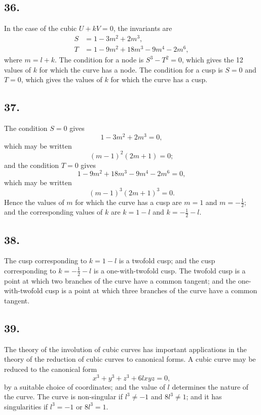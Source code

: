\documentclass[11pt,a4paper]{article}
\theoremstyle{definition}
\begin{document}
\subsection*{36.}

In the case of the cubic $U + kV = 0$, the invariants are
\begin{align*}
S &= 1 - 3m^{2} + 2m^{3},\\
T &= 1 - 9m^{2} + 18m^{3} - 9m^{4} - 2m^{6},
\end{align*}
where $m = l + k$. The condition for a node is $S^{3} - T^{2} = 0$, which gives the 12 values of $k$
for which the curve has a node. The condition for a cusp is $S = 0$ and $T = 0$, which gives
the values of $k$ for which the curve has a cusp.

\newpage
\subsection*{37.}

The condition $S = 0$ gives
\[
1 - 3m^{2} + 2m^{3} = 0,
\]
which may be written
\[
(m - 1)^{2}(2m + 1) = 0;
\]
and the condition $T = 0$ gives
\[
1 - 9m^{2} + 18m^{3} - 9m^{4} - 2m^{6} = 0,
\]
which may be written
\[
(m - 1)^{3}(2m + 1)^{3} = 0.
\]
Hence the values of $m$ for which the curve has a cusp are $m = 1$ and $m = -\frac{1}{2}$; and the
corresponding values of $k$ are $k = 1 - l$ and $k = -\frac{1}{2} - l$.

\subsection*{38.}

The cusp corresponding to $k = 1 - l$ is a twofold cusp; and the cusp corresponding to
$k = -\frac{1}{2} - l$ is a one-with-twofold cusp. The twofold cusp is a point at which two branches
of the curve have a common tangent; and the one-with-twofold cusp is a point at which
three branches of the curve have a common tangent.

\newpage
\subsection*{39.}

The theory of the involution of cubic curves has important applications in the theory
of the reduction of cubic curves to canonical forms. A cubic curve may be reduced to
the canonical form
\[
x^{3} + y^{3} + z^{3} + 6lxyz = 0,
\]
by a suitable choice of coordinates; and the value of $l$ determines the nature of the curve.
The curve is non-singular if $l^{3} \neq -1$ and $8l^{3} \neq 1$; and it has singularities if $l^{3} = -1$ or
$8l^{3} = 1$.
\end{document}
